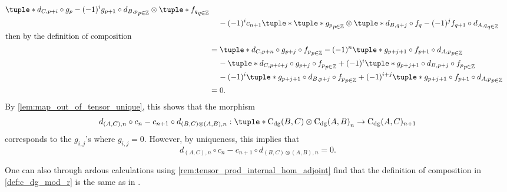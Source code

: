 \begin{remark}
\begin{enumerate}
{\begin{align*}
{                    \tuple*{
                        d_{C, p + i} \circ g_p - (-1)^i g_{p + 1} \circ d_{B, p}
                    }_{p \in \Zb} \otimes \tuple*{ f_q }_{q \in \Zb}
                } \\
                &\hspace{0.4cm} - (-1)^i c_{n + 1} \tuple*{
                    \tuple*{ g_p }_{p \in \Zb} \otimes \tuple*{
                        d_{B, q + j} \circ f_q - (-1)^j f_{q + 1} \circ d_{A, q}
                    }_{q \in \Zb}
                } \\
                \intertext{then by the definition of composition}
                &= \tuple*{
                    d_{C, p + n} \circ g_{p + j} \circ f_p
                }_{p \in \Zb} - (-1)^n \tuple*{
                    g_{p + j + 1} \circ f_{p + 1} \circ d_{A, p}
                }_{p \in \Zb} \\
                &\hspace{0.4cm} - \tuple*{
                    d_{C, p + i + j} \circ g_{p + j} \circ f_p
                }_{p \in \Zb} + (-1)^i \tuple*{
                    g_{p + j + 1} \circ d_{B, p + j} \circ f_p
                }_{p \in \Zb} \\
                &\hspace{0.4cm} - (-1)^i \tuple*{
                    g_{p + j + 1} \circ d_{B, p + j} \circ f_p
                }_{p \in \Zb} + (-1)^{i + j} \tuple*{
                    g_{p + j + 1} \circ f_{p + 1} \circ d_{A, p}
                }_{p \in \Zb} \\
                &= 0.
            \end{align*}
            By \autoref{lem:map_out_of_tensor_unique}, this shows that the morphism
            \[
                d_{(A, C), n} \circ c_n - c_{n + 1} \circ d_{(B, C) \otimes (A, B), n}: \\
                \tuple*{ \C_{\dg}(B, C) \otimes \C_{\dg}(A, B) }_n \to \C_{\dg}(A, C)_{n + 1}
            \]         
            corresponds to the \( g_{i,j} \)'s where \( g_{i, j} = 0 \). However, by uniqueness, this implies that
            \[
                d_{(A, C), n} \circ c_n - c_{n + 1} \circ d_{(B, C) \otimes (A, B), n} = 0.
            \]
        }
    \end{enumerate}
\end{remark}

One can also through ardous calculations using \autoref{rem:tensor_prod_internal_hom_adjoint} find that the definition of composition in \autoref{def:c_dg_mod_r} is the same as in \cite[p. 295]{Borceux_1994}.

